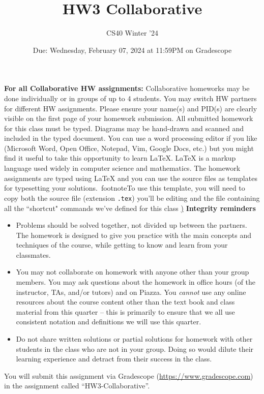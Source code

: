 \documentclass[12pt, oneside]{article}
\title{HW3 Collaborative}
\author{CS40 Winter '24}
\date{Due: Wednesday, February 07, 2024 at 11:59PM on Gradescope}
\begin{document}
\maketitle
{\bf For all Collaborative HW assignments:}
Collaborative homeworks may be done individually or in groups of
up to 4 students. You may switch HW partners for different HW
assignments. Please ensure your name(s) and PID(s) are clearly
visible on the first page of your homework submission.
All submitted homework for this class must be typed. Diagrams may
be hand-drawn and scanned and included in the typed document. You
can use a word processing editor if you like (Microsoft Word,
Open Office, Notepad, Vim, Google Docs, etc.) but you might find it
useful to take this opportunity to learn LaTeX. LaTeX is a markup
language used widely in computer science and mathematics. The
homework assignments are typed using LaTeX and you can use the
source files as templates for typesetting your solutions.\
footnote{To use this template, you will need to copy both the
source file (extension \texttt{.tex}) you'll be editing
and the file containing all the ``shortcut" commands we've defined
for this class
\href{https://drive.google.com/file/d/1FmQvgByKnNjTpIkAUw31TGWYrQZ
M-HK0/view?usp=sharing})}
{\bf Integrity reminders}
\begin{itemize}
\item Problems should be solved together, not divided up between
the partners. The homework is
designed to give you practice with the main concepts and
techniques of the course, while getting to know and learn from
your classmates.
\item You may not collaborate on homework with anyone other than
your group members.
You may ask questions about the homework in office hours (of the
instructor, TAs, and/or tutors) and
on Piazza. You \emph{cannot} use any online resources about the
course content other than the text
book and class material from this quarter -- this is primarily to
ensure that we all use consistent notation and
definitions we will use this quarter.
\item Do not share written solutions or partial solutions for
homework with other students in the class who are not in your
group. Doing so would dilute their learning experience and
detract from their success in the class.
\end{itemize}
You will submit this assignment via Gradescope
(\href{https://www.gradescope.com}{https://www.gradescope.com})
in the assignment called ``HW3-Collaborative''.
\end{document}
